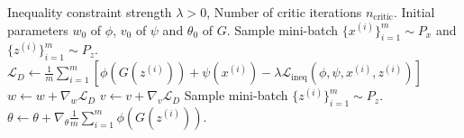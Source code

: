 \documentclass[runningheads]{llncs}
\begin{document}
\begin{algorithm}[t]
  \caption{W2GAN training method.}
  \label{alg:example1}
\begin{algorithmic}
  \REQUIRE Inequality constraint strength $\lambda>0$, Number of critic iterations $n_\mathrm{critic}$. 
  \REQUIRE Initial parameters $w_0$ of $\phi$, $v_0$ of $\psi$ and $\theta_0$ of $G$.
  \STATE Sample mini-batch $\{x^{(i)}\}_{i=1}^{m} \sim P_x$ and $\{z^{(i)}\}_{i=1}^{m} \sim P_z$.
  \STATE $\mathcal{L}_{D} \leftarrow \frac{1}{m} \sum_{i=1}^{m} \left[\phi(G(z^{(i)}))+\psi(x^{(i)}) -\lambda \mathcal{L}_{\text{ineq}}(\phi,\psi,x^{(i)}, z^{(i)}) \right]$
  \STATE $w \leftarrow w + \nabla_w \mathcal{L}_D$
  \STATE $v \leftarrow v + \nabla_v \mathcal{L}_D$
  \ENDFOR
  \STATE Sample mini-batch $\{z^{(i)}\}_{i=1}^{m} \sim P_z$.
  \STATE $\theta \leftarrow \theta + \nabla_\theta \frac{1}{m} \sum_{i=1}^{m}\phi(G(z^{(i)}))$.
  \ENDWHILE
\end{algorithmic}
\end{algorithm}
\end{document}
